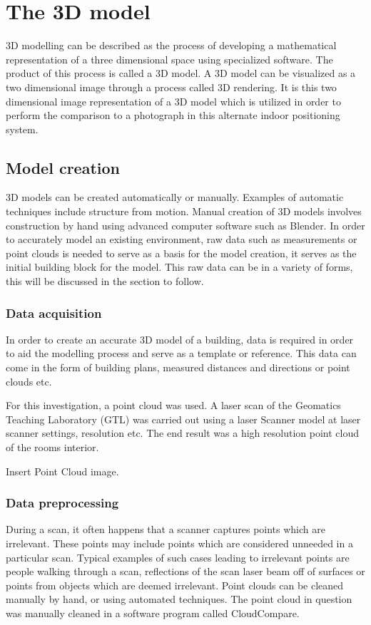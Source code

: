 \documentclass[11pt,a4paper]{report}
\begin{document}
	\newpage
	\section{The 3D model}
		3D modelling can be described as the process of developing a mathematical representation of a three dimensional space using specialized software. The product of this process is called a 3D model. A 3D model can be visualized as a two dimensional image through a process called 3D rendering. It is this two dimensional image representation of a 3D model which is utilized in order to perform the comparison to a photograph in this alternate indoor positioning system.
		
		\subsection{Model creation}
			3D models can be created automatically or manually. Examples of automatic techniques include structure from motion. Manual creation of 3D models involves construction by hand using advanced computer software such as Blender. In order to accurately model an existing environment, raw data such as measurements or point clouds is needed to serve as a basis for the model creation, it serves as the initial building block for the model. This raw data can be in a variety of forms, this will be discussed in the section to follow.
		
			\subsubsection{Data acquisition}
				In order to create an accurate 3D model of a building, data is required in order to aid the modelling process and serve as a template or reference. This data can come in the form of building plans, measured distances and directions or point clouds etc.
				
				For this investigation, a point cloud was used. A laser scan of the Geomatics Teaching Laboratory (GTL) was carried out using a {{laser Scanner model}} at {{laser scanner settings, resolution etc}}. The end result was a high resolution point cloud of the rooms interior. 
				
				{{Insert Point Cloud image}}.
				
			\subsubsection{Data preprocessing}
				During a scan, it often happens that a scanner captures points which are irrelevant. These points may include points which are considered unneeded in a particular scan. Typical examples of such cases leading to irrelevant points are people walking through a scan, reflections of the scan laser beam off of surfaces or points from objects which are deemed irrelevant. Point clouds can be cleaned manually by hand, or using automated techniques. The point cloud in question was manually cleaned in a software program called CloudCompare.
				
\end{document}
